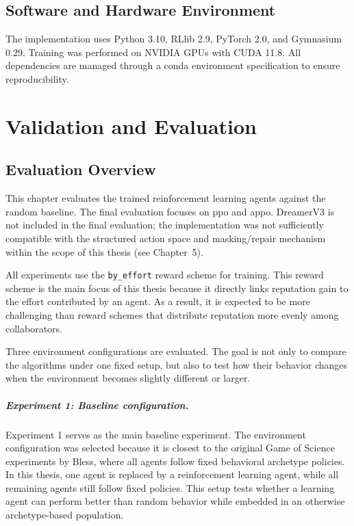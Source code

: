 \documentclass[english,bachelor]{hsluthesis}
\begin{document}
\section{Software and Hardware Environment}

The implementation uses Python 3.10, RLlib 2.9, PyTorch 2.0, and Gymnasium 0.29. Training was performed on NVIDIA GPUs with CUDA 11.8. All dependencies are managed through a conda environment specification to ensure reproducibility.

\chapter{Validation and Evaluation}

\section{Evaluation Overview}

This chapter evaluates the trained reinforcement learning agents against the random baseline. The final evaluation focuses on \gls{ppo} and \gls{appo}. DreamerV3 is not included in the final evaluation; the implementation was not sufficiently compatible with the structured action space and masking/repair mechanism within the scope of this thesis (see Chapter~5).

All experiments use the \texttt{by\_effort} reward scheme for training. This reward scheme is the main focus of this thesis because it directly links reputation gain to the effort contributed by an agent. As a result, it is expected to be more challenging than reward schemes that distribute reputation more evenly among collaborators.

Three environment configurations are evaluated. The goal is not only to compare the algorithms under one fixed setup, but also to test how their behavior changes when the environment becomes slightly different or larger.

\paragraph{Experiment 1: Baseline configuration.}
Experiment 1 serves as the main baseline experiment. The environment configuration was selected because it is closest to the original Game of Science experiments by Bless, where all agents follow fixed behavioral archetype policies. In this thesis, one agent is replaced by a reinforcement learning agent, while all remaining agents still follow fixed policies. This setup tests whether a learning agent can perform better than random behavior while embedded in an otherwise archetype-based population.
\end{document}
